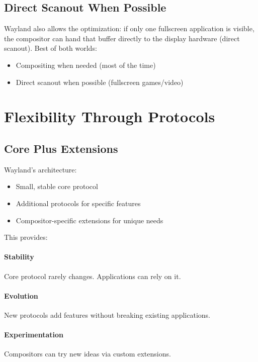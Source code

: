 \subsection{Direct Scanout When Possible}

Wayland also allows the optimization: if only one fullscreen application is visible, the compositor can hand that buffer directly to the display hardware (direct scanout). Best of both worlds:
\begin{itemize}
    \item Compositing when needed (most of the time)
    \item Direct scanout when possible (fullscreen games/video)
\end{itemize}

\section{Flexibility Through Protocols}

\subsection{Core Plus Extensions}

Wayland's architecture:
\begin{itemize}
    \item Small, stable core protocol
    \item Additional protocols for specific features
    \item Compositor-specific extensions for unique needs
\end{itemize}

This provides:

\paragraph{Stability}
Core protocol rarely changes. Applications can rely on it.

\paragraph{Evolution}
New protocols add features without breaking existing applications.

\paragraph{Experimentation}
Compositors can try new ideas via custom extensions.

